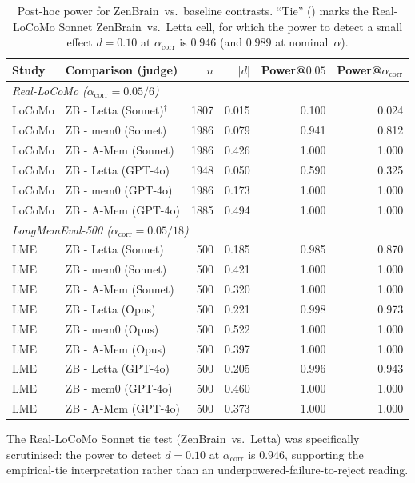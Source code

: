 \documentclass{article}
\begin{document}
\begin{table}[h]
\centering
\small
\caption{Post-hoc power for ZenBrain~vs.~baseline contrasts. ``Tie''
(\dag) marks the Real-LoCoMo Sonnet ZenBrain~vs.~Letta cell, for which
the power to detect a small effect $d{=}0.10$ at $\alpha_{\text{corr}}$
is $0.946$ (and $0.989$ at nominal~$\alpha$).}
\label{tab:power-analysis}
\begin{tabular}{llrrrr}
\toprule
Study & Comparison (judge) & $n$ & $|d|$ & Power@$0.05$ & Power@$\alpha_{\text{corr}}$ \\
\midrule
\multicolumn{6}{l}{\emph{Real-LoCoMo ($\alpha_{\text{corr}}{=}0.05/6$)}} \\
LoCoMo & ZB - Letta (Sonnet)$^\dag$ & 1807 & 0.015 & 0.100 & 0.024 \\
LoCoMo & ZB - mem0  (Sonnet)        & 1986 & 0.079 & 0.941 & 0.812 \\
LoCoMo & ZB - A-Mem (Sonnet)        & 1986 & 0.426 & 1.000 & 1.000 \\
LoCoMo & ZB - Letta (GPT-4o)        & 1948 & 0.050 & 0.590 & 0.325 \\
LoCoMo & ZB - mem0  (GPT-4o)        & 1986 & 0.173 & 1.000 & 1.000 \\
LoCoMo & ZB - A-Mem (GPT-4o)        & 1885 & 0.494 & 1.000 & 1.000 \\
\midrule
\multicolumn{6}{l}{\emph{LongMemEval-500 ($\alpha_{\text{corr}}{=}0.05/18$)}} \\
LME & ZB - Letta (Sonnet) & 500 & 0.185 & 0.985 & 0.870 \\
LME & ZB - mem0  (Sonnet) & 500 & 0.421 & 1.000 & 1.000 \\
LME & ZB - A-Mem (Sonnet) & 500 & 0.320 & 1.000 & 1.000 \\
LME & ZB - Letta (Opus)   & 500 & 0.221 & 0.998 & 0.973 \\
LME & ZB - mem0  (Opus)   & 500 & 0.522 & 1.000 & 1.000 \\
LME & ZB - A-Mem (Opus)   & 500 & 0.397 & 1.000 & 1.000 \\
LME & ZB - Letta (GPT-4o) & 500 & 0.205 & 0.996 & 0.943 \\
LME & ZB - mem0  (GPT-4o) & 500 & 0.460 & 1.000 & 1.000 \\
LME & ZB - A-Mem (GPT-4o) & 500 & 0.373 & 1.000 & 1.000 \\
\bottomrule
\end{tabular}
\end{table}

The Real-LoCoMo Sonnet tie test (ZenBrain~vs.~Letta) was specifically
scrutinised: the power to detect $d{=}0.10$ at $\alpha_{\text{corr}}$
is $0.946$, supporting the empirical-tie interpretation rather than an
underpowered-failure-to-reject reading.
\end{document}
